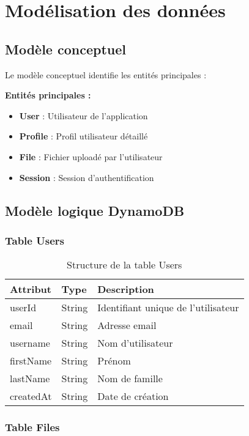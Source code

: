 \section{Modélisation des données}

\subsection{Modèle conceptuel}

Le modèle conceptuel identifie les entités principales :

\textbf{Entités principales :}
\begin{itemize}
    \item \textbf{User} : Utilisateur de l'application
    \item \textbf{Profile} : Profil utilisateur détaillé
    \item \textbf{File} : Fichier uploadé par l'utilisateur
    \item \textbf{Session} : Session d'authentification
\end{itemize}

\subsection{Modèle logique DynamoDB}

\subsubsection{Table Users}

\begin{table}[H]
\centering
\caption{Structure de la table Users}
\begin{tabular}{|l|l|l|}
\hline
\textbf{Attribut} & \textbf{Type} & \textbf{Description} \\
\hline
userId & String & Identifiant unique de l'utilisateur \\
\hline
email & String & Adresse email \\
\hline
username & String & Nom d'utilisateur \\
\hline
firstName & String & Prénom \\
\hline
lastName & String & Nom de famille \\
\hline
createdAt & String & Date de création \\
\hline
\end{tabular}
\end{table}

\subsubsection{Table Files}

